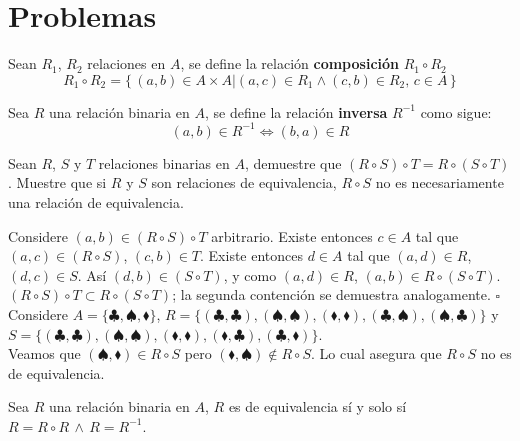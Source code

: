 \section{Problemas}
\begin{definition}
    Sean $R_1$, $R_2$ relaciones en $A$, se define la relación
    \textbf{composición} $R_1 \circ R_2$
    \[
        R_1 \circ R_2 = \{\, (a,b) \in A \times A  | (a,c) \in R_1 \land (c,b)
        \in R_2 , \, c \in A\,\}
    \]
\end{definition}
\begin{definition}
    Sea $R$ una relación binaria en $A$, se define la relación
    \textbf{inversa} $R^{-1}$ como sigue:
    \[
        (a,b) \in R^{-1} \Leftrightarrow (b,a) \in R
    \]
\end{definition}
\begin{problem}
    Sean $R$, $S$ y $T$ relaciones binarias en $A$, demuestre que $(R \circ
    S) \circ T = R \circ (S \circ T)$. Muestre que si $R$ y $S$ son
    relaciones de
    equivalencia, $R \circ S$ no es
    necesariamente una relación de equivalencia. 
\end{problem}
\begin{sol}
    Considere $(a,b) \in (R \circ S) \circ T$ arbitrario. Existe entonces
    $c\in A$ tal que
    $(a,c) \in (R \circ S)$, $(c,b) \in T$. Existe entonces $d\in A$ tal que
    $(a,d) \in R$, $(d,c) \in S$. Así $(d,b) \in (S \circ T)$, y como $(a,d)
    \in R$, $(a,b) \in R \circ (S \circ T)$. $(R \circ
    S) \circ T \subset R \circ (S \circ T)$; la segunda contención se
    demuestra analogamente.
    \hfill$\square$ \\
    Considere $A=\{\clubsuit, \spadesuit, \blacklozenge\}$, 
    $R=\{(\clubsuit, \clubsuit), (\spadesuit,\spadesuit),
    (\blacklozenge,\blacklozenge),(\clubsuit,\spadesuit),(\spadesuit,\clubsuit)\}$
    y 
    $S=\{(\clubsuit, \clubsuit), (\spadesuit,\spadesuit),
        (\blacklozenge,\blacklozenge),(\blacklozenge, \clubsuit), (\clubsuit,
    \blacklozenge)\}$.\\
    Veamos que $(\spadesuit, \blacklozenge) \in R \circ S$ pero $(\blacklozenge,
    \spadesuit) \notin R \circ S$. Lo cual asegura que $R \circ S$ no es de
    equivalencia.
\end{sol}
\begin{problem}
    Sea $R$ una relación binaria en $A$, $R$ es de equivalencia sí y solo sí $R=R\circ R \, \land \, R=R^{-1}$.
\end{problem}

